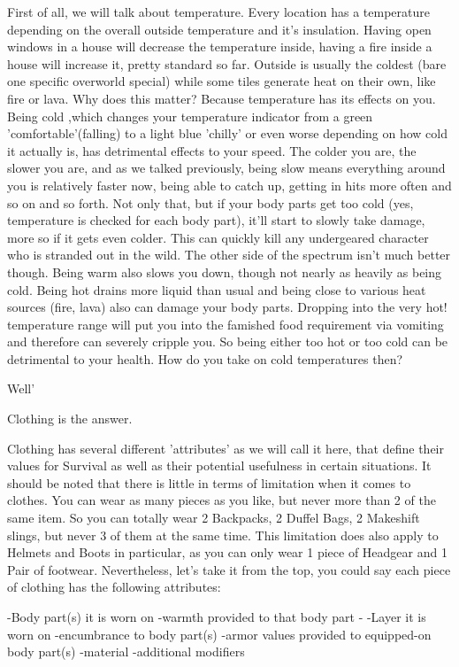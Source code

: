 \documentclass[11pt]{report}
\begin{document}
First of all, we will talk about temperature. Every location has a temperature depending on the overall outside temperature and it's insulation. Having open windows in a house will decrease the temperature inside, having a fire inside a house will increase it, pretty standard so far. Outside is usually the coldest (bare one specific overworld special) while some tiles generate heat on their own, like fire or lava. Why does this matter? Because temperature has its effects on you. Being cold ,which changes your temperature indicator from a green 'comfortable'(falling) to a light blue 'chilly' or even worse depending on how cold it actually is, has detrimental effects to your speed. The colder you are, the slower you are, and as we talked previously, being slow means everything around you is relatively faster now, being able to catch up, getting in hits more often and so on and so forth. Not only that, but if your body parts get too cold (yes, temperature is checked for each body part), it'll start to slowly take damage, more so if it gets even colder. This can quickly kill any undergeared character who is stranded out in the wild. The other side of the spectrum isn't much better though. Being warm also slows you down, though not nearly as heavily as being cold. Being hot drains more liquid than usual and being close to various heat sources (fire, lava) also can damage your body parts. Dropping into the very hot! temperature range will put you into the famished food requirement via vomiting and therefore can severely cripple you. So being either too hot or too cold can be detrimental to your health. How do you take on cold temperatures then?

Well'

Clothing is the answer.

Clothing has several different 'attributes' as we will call it here, that define their values for Survival as well as their potential usefulness in certain situations. It should be noted that there is little in terms of limitation when it comes to clothes. You can wear as many pieces as you like, but never more than 2 of the same item. So you can totally wear 2 Backpacks, 2 Duffel Bags, 2 Makeshift slings, but never 3 of them at the same time. This limitation does also apply to Helmets and Boots in particular, as you can only wear 1 piece of Headgear and 1 Pair of footwear.
Nevertheless, let's take it from the top, you could say each piece of clothing has the following attributes:

-Body part(s) it is worn on
-warmth provided to that body part
-%
-Layer it is worn on
-encumbrance to body part(s)
-armor values provided to equipped-on body part(s)
-material
-additional modifiers
\end{document}
